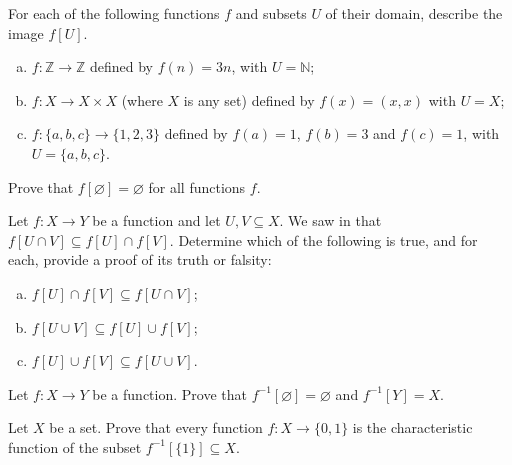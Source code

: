 \begin{exercise}
For each of the following functions $f$ and subsets $U$ of their domain, describe the image $f[U]$.
\begin{enumerate}[(a)]
\item $f : \mathbb{Z} \to \mathbb{Z}$ defined by $f(n)=3n$, with $U = \mathbb{N}$;
\item $f : X \to X \times X$ (where $X$ is any set) defined by $f(x)=(x,x)$ with $U=X$;
\item $f : \{ a, b, c \} \to \{ 1, 2, 3 \}$ defined by $f(a)=1$, $f(b)=3$ and $f(c)=1$, with $U=\{a,b,c\}$.
\end{enumerate}
\end{exercise}

\begin{exercise}
Prove that $f[\varnothing] = \varnothing$ for all functions $f$.
\end{exercise}


\begin{exercise}
Let $f : X \to Y$ be a function and let $U, V \subseteq X$. We saw in  that $f[U \cap V] \subseteq f[U] \cap f[V]$. Determine which of the following is true, and for each, provide a proof of its truth or falsity:
\begin{enumerate}[(a)]
\item $f[U] \cap f[V] \subseteq f[U \cap V]$;
\item $f[U \cup V] \subseteq f[U] \cup f[V]$;
\item $f[U] \cup f[V] \subseteq f[U \cup V]$.
\end{enumerate}
\end{exercise}

\begin{exercise}
Let $f : X \to Y$ be a function. Prove that $f^{-1}[\varnothing] = \varnothing$ and $f^{-1}[Y]=X$.
\end{exercise}

\begin{exercise}
\label{exCharacteristicFunctionsCorrespondWithSubsets}
Let $X$ be a set. Prove that every function $f : X \to \{0,1\}$ is the characteristic function of the subset $f^{-1}[\{1\}] \subseteq X$.
\end{exercise}
